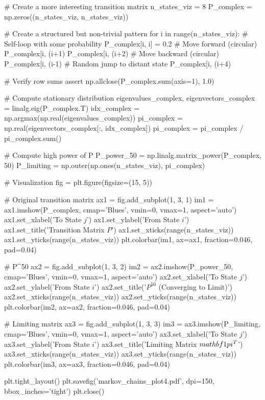 \documentclass[11pt,a4paper]{article}
\begin{document}
\begin{pycode}
# Create a more interesting transition matrix
n_states_viz = 8
P_complex = np.zeros((n_states_viz, n_states_viz))

# Create a structured but non-trivial pattern
for i in range(n_states_viz):
    # Self-loop with some probability
    P_complex[i, i] = 0.2
    # Move forward (circular)
    P_complex[i, (i+1) %
    P_complex[i, (i+2) %
    # Move backward (circular)
    P_complex[i, (i-1) %
    # Random jump to distant state
    P_complex[i, (i+4) %

# Verify row sums
assert np.allclose(P_complex.sum(axis=1), 1.0)

# Compute stationary distribution
eigenvalues_complex, eigenvectors_complex = linalg.eig(P_complex.T)
idx_complex = np.argmax(np.real(eigenvalues_complex))
pi_complex = np.real(eigenvectors_complex[:, idx_complex])
pi_complex = pi_complex / pi_complex.sum()

# Compute high power of P
P_power_50 = np.linalg.matrix_power(P_complex, 50)
P_limiting = np.outer(np.ones(n_states_viz), pi_complex)

# Visualization
fig = plt.figure(figsize=(15, 5))

# Original transition matrix
ax1 = fig.add_subplot(1, 3, 1)
im1 = ax1.imshow(P_complex, cmap='Blues', vmin=0, vmax=1, aspect='auto')
ax1.set_xlabel('To State $j$')
ax1.set_ylabel('From State $i$')
ax1.set_title('Transition Matrix $P$')
ax1.set_xticks(range(n_states_viz))
ax1.set_yticks(range(n_states_viz))
plt.colorbar(im1, ax=ax1, fraction=0.046, pad=0.04)

# P^50
ax2 = fig.add_subplot(1, 3, 2)
im2 = ax2.imshow(P_power_50, cmap='Blues', vmin=0, vmax=1, aspect='auto')
ax2.set_xlabel('To State $j$')
ax2.set_ylabel('From State $i$')
ax2.set_title('$P^{50}$ (Converging to Limit)')
ax2.set_xticks(range(n_states_viz))
ax2.set_yticks(range(n_states_viz))
plt.colorbar(im2, ax=ax2, fraction=0.046, pad=0.04)

# Limiting matrix
ax3 = fig.add_subplot(1, 3, 3)
im3 = ax3.imshow(P_limiting, cmap='Blues', vmin=0, vmax=1, aspect='auto')
ax3.set_xlabel('To State $j$')
ax3.set_ylabel('From State $i$')
ax3.set_title('Limiting Matrix $\\mathbf{1}\\pi^T$')
ax3.set_xticks(range(n_states_viz))
ax3.set_yticks(range(n_states_viz))
plt.colorbar(im3, ax=ax3, fraction=0.046, pad=0.04)

plt.tight_layout()
plt.savefig('markov_chains_plot4.pdf', dpi=150, bbox_inches='tight')
plt.close()
\end{pycode}
\end{document}
